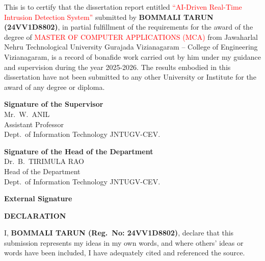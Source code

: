 \documentclass[12pt,a4paper]{report}
\begin{document}
\vspace{0.4cm}
\justifying
This is to certify that the dissertation report entitled
\textcolor{red}{``AI-Driven Real-Time Intrusion Detection System''}
submitted by \textbf{\textcolor{mydarkblue}{BOMMALI TARUN (24VV1D8802)}},
in partial fulfillment of the requirements for the award of the degree of
{\textcolor{red}{MASTER OF COMPUTER APPLICATIONS (MCA)}} from Jawaharlal Nehru Technological University
Gurajada Vizianagaram -- College of Engineering Vizianagaram, is a record of
bonafide work carried out by him under my guidance and supervision during the year 2025-2026.
The results embodied in this dissertation have not been submitted
to any other University or Institute for the award of any degree or diploma.

\vspace{2.5cm}
\noindent
\begin{minipage}[t]{0.48\textwidth}
\raggedright
{\bfseries\textcolor{mydarkblue}{Signature of the Supervisor}}\\
\textcolor{mydarkblue}{Mr.\ W.\ ANIL}\\
Assistant Professor\\
Dept.\ of Information Technology JNTUGV-CEV.
\end{minipage}
\hfill
\begin{minipage}[t]{0.48\textwidth}
\raggedleft
{\bfseries\textcolor{mydarkblue}{Signature of the Head of the Department}}\\
\textcolor{mydarkblue}{Dr.\ B.\ TIRIMULA RAO}\\
Head of the Department\\
Dept.\ of Information Technology JNTUGV-CEV.
\end{minipage}
\vspace{2cm}
\begin{center}
{\bfseries\textcolor{mydarkblue}{External Signature}}
\end{center}

\newpage
\thispagestyle{empty}
\begin{center}
{\huge\bfseries DECLARATION}
\end{center}
\vspace{1.5cm}
\justifying

I, \textbf{\textcolor{mydarkblue}{BOMMALI TARUN (Reg.\ No: 24VV1D8802)}}, declare that this submission represents my ideas
in my own words, and where others' ideas or words have been included,
I have adequately cited and referenced the source.
\end{document}
